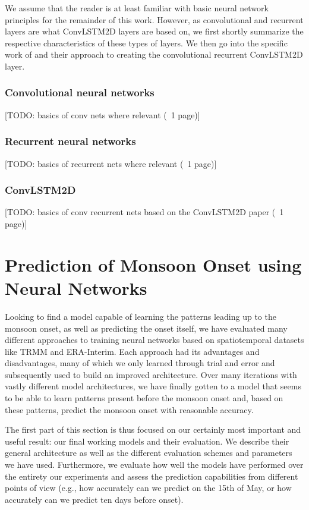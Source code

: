 We assume that the reader is at least familiar with basic neural network principles for the remainder of this work. However, as convolutional and recurrent layers are what ConvLSTM2D layers are based on, we first shortly summarize the respective characteristics of these types of layers. We then go into the specific work of \citet{Shi.2015} and their approach to creating the convolutional recurrent ConvLSTM2D layer.

\subsubsection{Convolutional neural networks}
\label{ssst:convolutional_networks}
[TODO: basics of conv nets where relevant (~1 page)]

\subsubsection{Recurrent neural networks}
\label{ssst:recurrent_networks}
[TODO: basics of recurrent nets where relevant (~1 page)]

\subsubsection{ConvLSTM2D}
\label{ssst:conv_lstm_2d}
[TODO: basics of conv recurrent nets based on the ConvLSTM2D paper (~1 page)]


\newpage
\section{Prediction of Monsoon Onset using Neural Networks}
\label{st:nn_implementation}
Looking to find a model capable of learning the patterns leading up to the monsoon onset, as well as predicting the onset itself, we have evaluated many different approaches to training neural networks based on spatiotemporal datasets like TRMM and ERA-Interim. Each approach had its advantages and disadvantages, many of which we only learned through trial and error and subsequently used to build an improved architecture. Over many iterations with vastly different model architectures, we have finally gotten to a model that seems to be able to learn patterns present before the monsoon onset and, based on these patterns, predict the monsoon onset with reasonable accuracy.

The first part of this section is thus focused on our certainly most important and useful result: our final working models and their evaluation. We describe their general architecture as well as the different evaluation schemes and parameters we have used. Furthermore, we evaluate how well the models have performed over the entirety our experiments and assess the prediction capabilities from different points of view (e.g., how accurately can we predict on the 15th of May, or how accurately can we predict ten days before onset).

